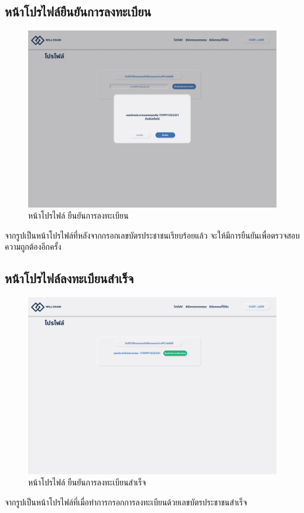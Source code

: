 \documentclass[12pt,oneside,openright,a4paper]{cpe-thai-project}
\begin{document}
\subsection{หน้าโปรไฟล์ยืนยันการลงทะเบียน}
		\begin{figure}[!thb]
			\centering
			\includegraphics[scale=0.2]{profileConfirm}
			\caption{หน้าโปรไฟล์ ยืนยันการลงทะเบียน}
		\end{figure}
		\FloatBarrier
		\tab จากรูปเป็นหน้าโปรไฟล์ที่หลังจากกรอกเลขบัตรประชาชนเรียบร้อยแล้ว จะให้มีการยืนยันเพื่อตรวจสอบความถูกต้องอีกครั้ง
\subsection{หน้าโปรไฟล์ลงทะเบียนสำเร็จ}
		\begin{figure}[!thb]
			\centering
			\includegraphics[scale=0.2]{profileSuccess}
			\caption{หน้าโปรไฟล์ ยืนยันการลงทะเบียนสำเร็จ}
		\end{figure}
		\FloatBarrier
		\tab จากรูปเป็นหน้าโปรไฟล์ที่เมื่อทำการกรอกการลงทะเบียนด้วยเลขบัตรประชาชนสำเร็จ
\end{document}
